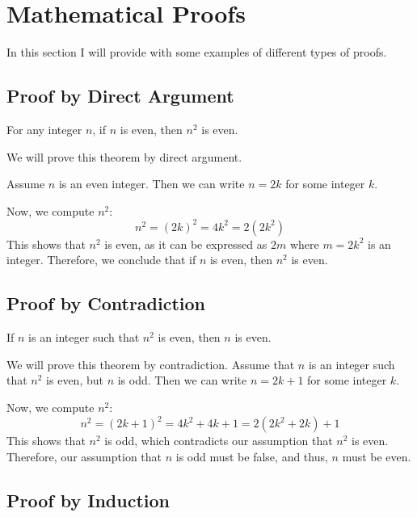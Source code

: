 \newpage
\section{Mathematical Proofs}

In this section I will provide with some examples of different types of proofs.

\subsection{Proof by Direct Argument}

For any integer \( n \), if \( n \) is even, then \( n^2 \) is even.
\vspace{\baselineskip}

We will prove this theorem by direct argument.
\vspace{\baselineskip}

Assume \( n \) is an even integer. Then we can write \( n = 2k \) for some integer \( k \).
\vspace{\baselineskip}

	Now, we compute \( n^2 \):
	\[
		n^2 = {(2k)}^2 = 4k^2 = 2(2k^2)
	\]
	This shows that \( n^2 \) is even, as it can be expressed as \( 2m \) where \( m = 2k^2 \) is an integer.
	Therefore, we conclude that if \( n \) is even, then \( n^2 \) is even.
\QED

\subsection{Proof by Contradiction}

If \( n \) is an integer such that \( n^2 \) is even, then \( n \) is even.
\vspace{\baselineskip}

We will prove this theorem by contradiction. Assume that \( n \) is an integer such that \( n^2 \) is even, but \( n \) is odd. Then we can write \( n = 2k + 1 \) for some integer \( k \).
\vspace{\baselineskip}

	Now, we compute \( n^2 \):
	\[
		n^2 = {(2k + 1)}^2 = 4k^2 + 4k + 1 = 2(2k^2 + 2k) + 1
	\]
	This shows that \( n^2 \) is odd, which contradicts our assumption that \( n^2 \) is even. Therefore, our assumption that \( n \) is odd must be false, and thus, \( n \) must be even.
\QED

\subsection{Proof by Induction}


